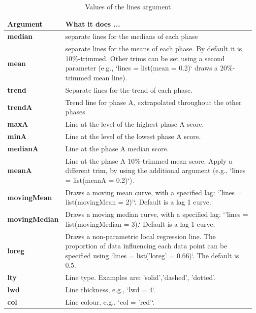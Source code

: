 \documentclass[
]{book}
\begin{document}
\begin{table}

\caption{\label{tab:table-lines-arguments}Values of the lines argument}
\centering
\begin{tabular}[t]{>{\raggedright\arraybackslash}p{15em}>{\raggedright\arraybackslash}p{30em}}
\toprule
Argument & What it does ...\\
\midrule
\textbf{median} & separate lines for the medians of each phase\\
\textbf{mean} & separate lines for the means of each phase. By default it is 10\%-trimmed. Other trims can be set using a second parameter (e.g., `lines = list(mean = 0.2)` draws a 20\%-trimmed mean line).\\
\textbf{trend} & Separate lines for the trend of each phase.\\
\textbf{trendA} & Trend line for phase A, extrapolated throughout the other phases\\
\textbf{maxA} & Line at the level of the highest phase A score.\\
\addlinespace
\textbf{minA} & Line at the level of the lowest phase A score.\\
\textbf{medianA} & Line at the phase A median score.\\
\textbf{meanA} & Line at the phase A 10\%-trimmed mean score. Apply a different trim, by using the additional argument (e.g., `lines = list(meanA = 0.2)`).\\
\textbf{movingMean} & Draws a moving mean curve, with a specified lag: `'lines = list(movingMean = 2)'`. Default is a lag 1 curve.\\
\textbf{movingMedian} & Draws a moving median curve, with a specified lag: `'lines = list(movingMedian = 3).` Default is a lag 1 curve.\\
\addlinespace
\textbf{loreg} & Draws a non-parametric local regression line. The proportion of data influencing each data point can be specified using `lines = list('loreg' = 0.66)`. The default is 0.5.\\
\textbf{lty} & Line type. Examples are: 'solid','dashed', 'dotted'.\\
\textbf{lwd} & Line thickness, e.g., `lwd = 4`.\\
\textbf{col} & Line colour, e.g., `col = 'red'`.\\
\bottomrule
\end{tabular}
\end{table}
\end{document}

